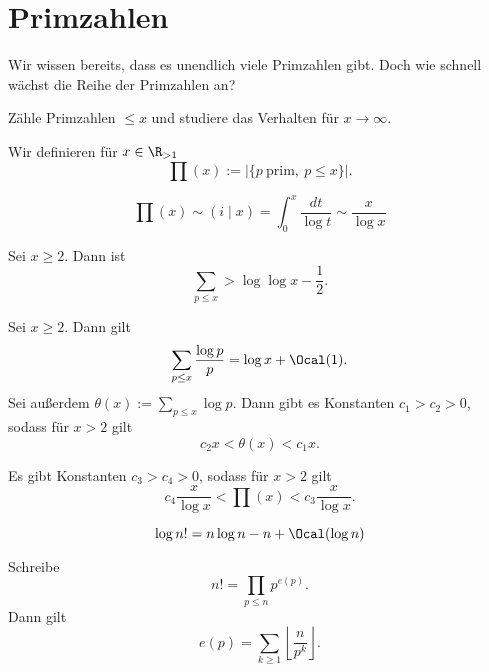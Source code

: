 \chapter{Primzahlen}

Wir wissen bereits, dass es unendlich viele Primzahlen gibt. Doch wie schnell wächst die Reihe der Primzahlen an?

\begin{idee*}
	Zähle Primzahlen $\leq x$ und studiere das Verhalten für $x \to \infty$.
\end{idee*}

\begin{defn*}
	Wir definieren für $x \in \R_{> 1}$
	\[ \prod(x) := |\{p \ \text{prim},\ p \leq x\}|. \]
\end{defn*}

\begin{conj*}[Gauß]
	\[ \prod(x) \sim (i \mid x) = \int_{0}^{x} \frac{dt}{\log t} \sim \frac{x}{\log x} \]
\end{conj*}

\begin{thm}\autolabel
	Sei $x \geq 2$. Dann ist \[ \sum_{p \leq x} > \log \log x - \frac{1}{2}. \]
\end{thm}

\begin{thm}\autolabel
	Sei $x \geq 2$. Dann gilt \[ \sum_{p \leq x} \frac{\log p}{p} = \log x + \Ocal(1). \]
	Sei außerdem $\theta(x) := \sum_{p \leq x} \log p$. Dann gibt es Konstanten $c_1 > c_2 > 0$, sodass für $x > 2$ gilt
	\[ c_2 x < \theta(x) < c_1 x. \]
\end{thm}

\begin{cor}\autolabel
	Es gibt Konstanten $c_3 > c_4 > 0$, sodass für $x > 2$ gilt
	\[ c_4 \frac{x}{\log x} < \prod(x) < c_3 \frac{x}{\log x}. \]
\end{cor}

\begin{lem}\autolabel
	\[ \log n! = n \log n - n + \Ocal(\log n) \]
\end{lem}

\begin{lem}\autolabel
	Schreibe
	\[ n! = \prod_{p \leq n} p^{e(p)}. \] Dann gilt
	\[ e(p) = \sum_{k \geq 1} \left\lfloor \frac{n}{p^k} \right\rfloor. \]
\end{lem}